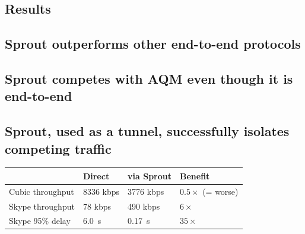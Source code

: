 \begin{multicols}{2}
\section*{Results}
\subsection*{Sprout outperforms other end-to-end protocols}
\begin{center}
\def\svgwidth{0.44\columnwidth}{\footnotesize  \bf }
\hspace{0.1\columnwidth}
\def\svgwidth{0.44\columnwidth}{\footnotesize  \bf }
\end{center}

\begin{center}
\def\svgwidth{0.44\columnwidth}{\footnotesize  \bf }
\hspace{0.1\columnwidth}
\def\svgwidth{0.44\columnwidth}{\footnotesize \bf  }
\end{center}

\subsection*{Sprout competes with AQM even though it is end-to-end}
\begin{center}
\def\svgwidth{0.44\columnwidth}\footnotesize \bf 
\end{center}

\subsection*{Sprout, used as a tunnel, successfully isolates competing traffic}
\begin{center}
{\large \bf
\noindent \begin{tabular}{|l|l|l|l|}
\hline
& Direct & via Sprout & Benefit \\
\hline
\hline
Cubic throughput & 8336 kbps & 3776 kbps & \cellcolor{red!20}$0.5 \times$ (= worse) \\
Skype throughput & 78 kbps & 490 kbps & \cellcolor{blue!20}$6 \times$ \\
Skype 95\% delay & 6.0~s & 0.17~s & \cellcolor{blue!20}$35 \times$ \\
\hline
\end{tabular}
}
\end{center}

\end{multicols}
